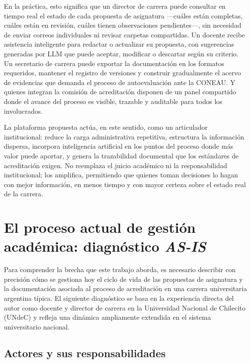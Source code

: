 En la práctica, esto significa que un director de carrera puede consultar en tiempo real el estado de cada propuesta de asignatura ---cuáles están completas, cuáles están en revisión, cuáles tienen observaciones pendientes---, sin necesidad de enviar correos individuales ni revisar carpetas compartidas. Un docente recibe asistencia inteligente para redactar o actualizar su propuesta, con sugerencias generadas por LLM que puede aceptar, modificar o descartar según su criterio. Un secretario de carrera puede exportar la documentación en los formatos requeridos, mantener el registro de versiones y construir gradualmente el acervo de evidencias que demanda el proceso de autoevaluación ante la CONEAU. Y quienes integran la comisión de acreditación disponen de un panel compartido donde el avance del proceso es visible, trazable y auditable para todos los involucrados.

La plataforma propuesta actúa, en este sentido, como un articulador institucional: reduce la carga administrativa repetitiva, estructura la información dispersa, incorpora inteligencia artificial en los puntos del proceso donde más valor puede aportar, y genera la trazabilidad documental que los estándares de acreditación exigen. No reemplaza el juicio académico ni la responsabilidad institucional; los amplifica, permitiendo que quienes toman decisiones lo hagan con mejor información, en menos tiempo y con mayor certeza sobre el estado real de la carrera.

\section{El proceso actual de gestión académica: diagnóstico \textit{AS-IS}}
\label{sec:proceso_asis}

Para comprender la brecha que este trabajo aborda, es necesario describir con precisión cómo se gestiona hoy el ciclo de vida de las propuestas de asignatura y la documentación asociada al proceso de acreditación en una carrera universitaria argentina típica. El siguiente diagnóstico se basa en la experiencia directa del autor como docente y director de carrera en la Universidad Nacional de Chilecito (UNdeC) y refleja una dinámica ampliamente extendida en el sistema universitario nacional.

\subsection{Actores y sus responsabilidades}
\label{subsec:actores_asis}

